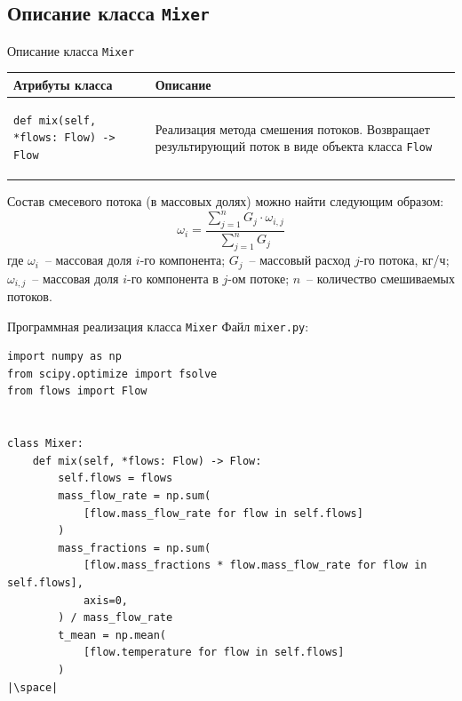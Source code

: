 \documentclass[aspectratio=169, mathserif]{beamer}	%
\begin{document}
\subsection{Описание класса \texttt{Mixer}}
\begin{frame}[fragile]{Описание класса \texttt{Mixer}}
\scriptsize
\begin{table}[h!]
	\centering
	\renewcommand{\arraystretch}{1.2}
	\begin{tabular}{|p{.49\linewidth}|p{.49\linewidth}|}
		\hline
		\textbf{Атрибуты класса} & \textbf{Описание}  \\
		\hline
\begin{minipage}{\linewidth}
\vfill
\begin{verbatim}
def mix(self, *flows: Flow) -> Flow
\end{verbatim}
\vfill
\end{minipage}
		& Реализация метода смешения потоков. Возвращает результирующий поток в виде объекта класса \texttt{Flow}\\
		\hline
	\end{tabular}
\end{table}
\vfill
Состав смесевого потока (в массовых долях) можно найти следующим образом:
\vfill
$$
	\omega _i = \dfrac{\sum \limits_ {j=1} ^{n} G_j \cdot \omega _{i,j}}{\sum \limits_ {j=1} ^{n} G_j}
$$
\vfill
где $\omega _i$~-- массовая доля $i$-го компонента; $G_j$~-- массовый расход $j$-го потока, кг/ч; $\omega _{i,j}$~-- массовая доля $i$-го компонента в $j$-ом потоке; $n$~-- количество смешиваемых потоков.
\vfill
\vfill
\end{frame}

\begin{frame}[fragile]{Программная реализация класса \texttt{Mixer}}
\scriptsize
Файл \texttt{mixer.py}:
\begin{verbatim}
import numpy as np
from scipy.optimize import fsolve
from flows import Flow


class Mixer:
    def mix(self, *flows: Flow) -> Flow:
        self.flows = flows
        mass_flow_rate = np.sum(
            [flow.mass_flow_rate for flow in self.flows]
        )
        mass_fractions = np.sum(
            [flow.mass_fractions * flow.mass_flow_rate for flow in self.flows],
            axis=0,
        ) / mass_flow_rate
        t_mean = np.mean(
            [flow.temperature for flow in self.flows]
        )
|\space|
\end{verbatim}
\vfill
\end{frame}
\end{document}
